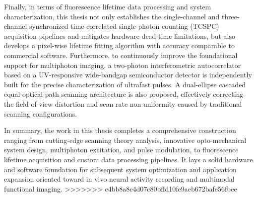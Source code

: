 Finally, in terms of fluorescence lifetime data processing and system characterization, this thesis not only establishes the single-channel and three-channel synchronized time-correlated single-photon counting (TCSPC) acquisition pipelines and mitigates hardware dead-time limitations, but also develops a pixel-wise lifetime fitting algorithm with accuracy comparable to commercial software. Furthermore, to continuously improve the foundational support for multiphoton imaging, a two-photon interferometric autocorrelator based on a UV-responsive wide-bandgap semiconductor detector is independently built for the precise characterization of ultrafast pulses. A dual-ellipse cascaded equal-optical-path scanning architecture is also proposed, effectively correcting the field-of-view distortion and scan rate non-uniformity caused by traditional scanning configurations.

In summary, the work in this thesis completes a comprehensive construction ranging from cutting-edge scanning theory analysis, innovative opto-mechanical system design, multiphoton excitation, and pulse modulation, to fluorescence lifetime acquisition and custom data processing pipelines. It lays a solid hardware and software foundation for subsequent system optimization and application expansion oriented toward in vivo neural activity recording and multimodal functional imaging.
>>>>>>> c4bb8a8e4d07c80bffd10fe9aeb672bafe56fbee


\pagestyle{enfrontmatterstyle}%
\cleardoublepage\pagestyle{frontmatterstyle}%

